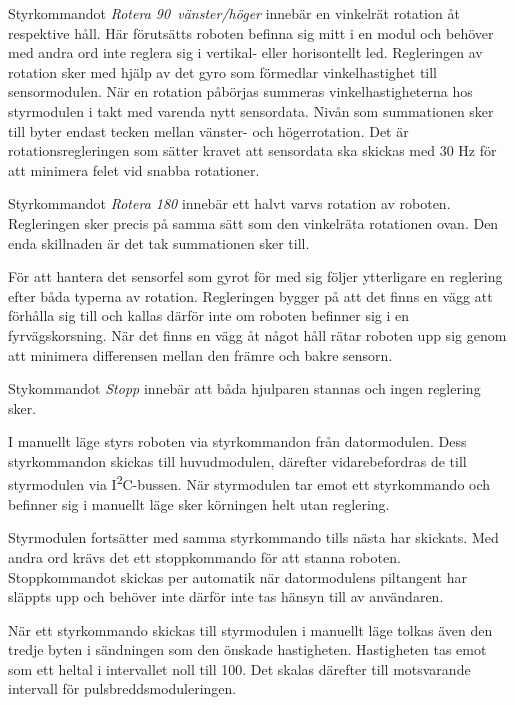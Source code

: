 \documentclass[11pt]{article}
\begin{document}
\begin{flushleft}
\begin{description}[style=unboxed, leftmargin=0cm]
Styrkommandot \textit{Rotera 90\textdegree\ vänster/höger} innebär en vinkelrät rotation åt respektive håll. Här förutsätts roboten befinna sig mitt i en modul och behöver med andra ord inte reglera sig i vertikal- eller horisontellt led. Regleringen av rotation sker med hjälp av det gyro som förmedlar vinkelhastighet till sensormodulen. När en rotation påbörjas summeras vinkelhastigheterna hos styrmodulen i takt med varenda nytt sensordata. Nivån som summationen sker till byter endast tecken mellan vänster- och högerrotation. Det är rotationsregleringen som sätter kravet att sensordata ska skickas med $30$ Hz för att minimera felet vid snabba rotationer. 

Styrkommandot \textit{Rotera 180\textdegree} innebär ett halvt varvs rotation av roboten. Regleringen sker precis på samma sätt som den vinkelräta rotationen ovan. Den enda skillnaden är det tak summationen sker till. 


För att hantera det sensorfel som gyrot för med sig följer ytterligare en reglering efter båda typerna av rotation. Regleringen bygger på att det finns en vägg att förhålla sig till och kallas därför inte om roboten befinner sig i en fyrvägskorsning. När det finns en vägg åt något håll rätar roboten upp sig genom att minimera differensen mellan den främre och bakre sensorn. 

Stykommandot \textit{Stopp} innebär att båda hjulparen stannas och ingen reglering sker. 

\item[Manuellt läge] I manuellt läge styrs roboten via styrkommandon från datormodulen. Dess styrkommandon skickas till huvudmodulen, därefter vidarebefordras de till styrmodulen via I\textsuperscript{2}C-bussen. När styrmodulen tar emot ett styrkommando och befinner sig i manuellt läge sker körningen helt utan reglering. 

  Styrmodulen fortsätter med samma styrkommando tills nästa har skickats. Med andra ord krävs det ett stoppkommando för att stanna roboten. Stoppkommandot skickas per automatik när datormodulens piltangent har släppts upp och behöver inte därför inte tas hänsyn till av användaren. 

  När ett styrkommando skickas till styrmodulen i manuellt läge tolkas även den tredje byten i sändningen som den önskade hastigheten. Hastigheten tas emot som ett heltal i intervallet noll till 100. Det skalas därefter till motsvarande intervall för pulsbreddsmoduleringen.

  \end{description}


\end{flushleft}
\end{document}

